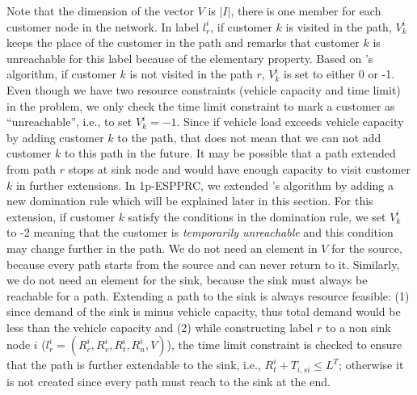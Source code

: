 Note that the dimension of the vector $V$ is $|I|$, there is one member
for each customer node in the network. In label $l_r^i$, if customer $k$
is visited in the path, $V^i_k$ keeps the place of the customer in the path and
remarks that customer $k$ is unreachable for this label because of the elementary 
property. Based on \citet{Feillet}'s algorithm, if customer $k$ is not visited in 
the path $r$, $V^i_k$ is set to either 0 or -1. Even though we have two resource constraints 
(vehicle capacity and time limit) in the problem,  we only check the time limit constraint
to mark a customer as ``unreachable'', i.e., to set $V^i_k = -1$. 
Since if vehicle load exceeds vehicle capacity by adding customer $k$ to the path, 
that does not mean that we can not add customer $k$ to this path in the future. It 
may be possible that a path extended from path $r$ stops at sink node and would have
enough capacity to visit customer $k$ in further extensions. 
In 1p-ESPPRC, we extended \citet{Feillet}'s algorithm by adding a new domination rule
which will be explained later in this section. For this extension, if customer $k$
satisfy the conditions in the domination rule, we set $V^i_k$ to -2 meaning that 
the customer is {\em temporarily unreachable} and this condition may change further in
the path. We do not need an element in $V$ for the source, because every path starts 
from the source and can never return to it. Similarly, we do not need an element for 
the sink, because the sink must always be reachable for a path. Extending a path to 
the sink is always resource feasible: (1) since demand of the sink is minus 
vehicle capacity, thus total demand would be less than the vehicle capacity and 
(2) while constructing label $r$ to a non sink node $i$ 
($l_{r}^i = (R^i_c, R^i_{v},R^i_{t}, R^i_n, V)$), the time limit constraint is checked 
to ensure that the path is further extendable to the sink, i.e., 
$R^i_{t} + T_{i,si} \leq L^T$; otherwise it is not created since every path
must reach to the sink at the end.     

